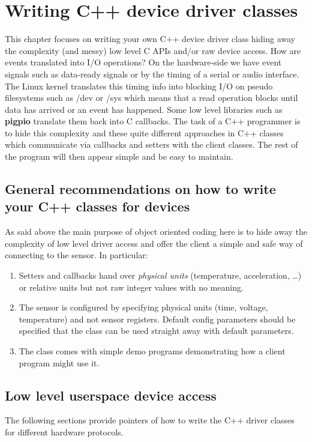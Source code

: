 \documentclass[12pt]{report}
\begin{document}
\chapter{Writing C++ device driver classes\label{drivers}}
This chapter focuses on writing your own C++ device driver class
hiding away the complexity (and messy) low level C APIs and/or raw
device access. How are events translated into I/O operations? On the
hardware-side we have event signals such as data-ready signals or by
the timing of a serial or audio interface. The Linux kernel translates
this timing info into blocking I/O on pseudo filesystems such as /dev
or /sys which means that a read operation blocks until data has arrived
or an event has happened. Some low level libraries such as \textbf{pigpio}
translate them back into C callbacks. The task of a C++ programmer is
to hide this complexity and these quite different approaches in C++
classes which communicate via callbacks and setters with the client
classes. The rest of the program will then appear simple and be
easy to maintain.

\section{General recommendations on how to write your C++ classes for devices}
As said above the main purpose of object oriented coding here is to
hide away the complexity of low level driver access and offer the
client a simple and safe way of connecting to the sensor. In
particular:
\begin{enumerate}
\item Setters and callbacks hand over \textsl{physical units}
  (temperature, acceleration, \ldots) or relative units but not raw
  integer values with no meaning.
\item The sensor is configured by specifying physical units (time,
  voltage, temperature) and not sensor registers. Default config parameters
  should be specified that the class can be used straight away with
  default parameters.
\item The class comes with simple demo programs demonstrating how
  a client program might use it.
\end{enumerate}

\section{Low level userspace device access}
The following sections provide pointers of how to write
the C++ driver classes for different hardware protocols.
\end{document}
